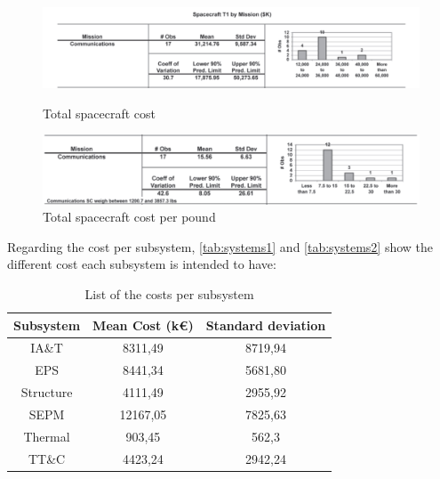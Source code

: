 \documentclass[11pt,a4paper,titlepage]{article}
\begin{document}
		\begin{figure}
			\centering
			\begin{minipage}{1\textwidth}
			\centering
			\includegraphics[width = .95\textwidth]{Mission.png}
			\caption{Total spacecraft cost}
			\label{fig:mission}
			\end{minipage}
			\hspace{20mm}
			\begin{minipage}{.95\textwidth}
			\centering
			\includegraphics[width = .95\textwidth]{Mission_pound.png}
			\caption{Total spacecraft cost per pound}
			\label{fig:mission_pound}
			\end{minipage}
		\end{figure}

		Regarding the cost per subsystem, \autoref{tab:systems1} and \autoref{tab:systems2} show the different cost each 				subsystem is intended to have:

		\begin{table}
			\centering
			\begin{tabular}{ccc}
			\toprule
			Subsystem & Mean Cost (k\euro) & Standard deviation\\
			\midrule
			IA\&T     & 8311,49   & 8719,94\\
			EPS        & 8441,34   & 5681,80\\
			Structure & 4111,49   & 2955,92\\
			SEPM      & 12167,05 & 7825,63\\
			Thermal  & 903,45    & 562,3\\
			TT\&C    & 4423,24   & 2942,24\\
			\bottomrule
			\end{tabular}
			\caption{List of the costs per subsystem}
			\label{tab:systems1}
		\end{table}
\end{document}
